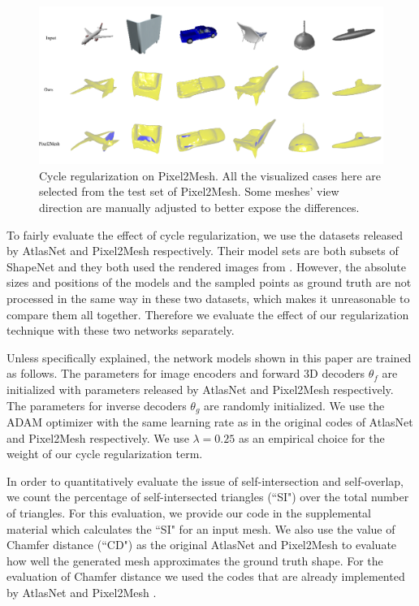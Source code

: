 \begin{figure}[t]
	\centering
	\includegraphics[width=\linewidth]{img/p2m/final}
	\caption{Cycle regularization on Pixel2Mesh. All the visualized cases here are selected from the test set of Pixel2Mesh. Some meshes' view direction are manually adjusted to better expose the differences.}
	\label{fig:p2m}
\end{figure}
 To fairly evaluate the effect of cycle regularization, we use the datasets released by AtlasNet and Pixel2Mesh respectively. Their model sets are both subsets of ShapeNet \cite{shapenetdata} and they both used the rendered images from \cite{3DR2N2}. However, the absolute sizes and positions of the models and the sampled points as ground truth are not processed in the same way in these two datasets, which makes it unreasonable to compare them all together. Therefore we evaluate the effect of our regularization technique with these two networks separately.

Unless specifically explained, the network models shown in this paper are trained as follows. The parameters for image encoders and forward 3D decoders $\theta_f$ are initialized with parameters released by AtlasNet \cite{atlasnet} and Pixel2Mesh \cite{pixel2mesh} respectively. The parameters for inverse decoders $\theta_g$ are randomly initialized. We use the ADAM \cite{adam} optimizer with the same learning rate as in the original codes of AtlasNet and Pixel2Mesh respectively. We use $\lambda=0.25$ as an empirical choice for the weight of our cycle regularization term.

In order to quantitatively evaluate the issue of self-intersection and self-overlap, we count the percentage of self-intersected triangles (``SI") over the total number of triangles. For this evaluation, we provide our code in the supplemental material which calculates the ``SI" for an input mesh.  
We also use the value of Chamfer distance (``CD") as the original AtlasNet and Pixel2Mesh to evaluate how well the generated mesh approximates the ground truth shape. For the evaluation of Chamfer distance we used the codes that are already implemented by AtlasNet \cite{atlasnet} and Pixel2Mesh \cite{pixel2mesh}.

